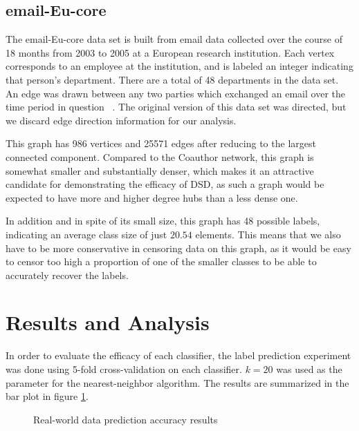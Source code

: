 \subsection{email-Eu-core}

The email-Eu-core data set is built from email data collected over the course of 18 months from 2003
to 2005 at a European research institution. Each vertex corresponds to an employee at the
institution, and is labeled an integer indicating that person's department. There are a total of 48
departments in the data set. An edge was drawn between any two parties which exchanged an email over
the time period in question ~\cite{snapnets}. The original version of this data set was directed,
but we discard edge direction information for our analysis.

This graph has 986 vertices and 25571 edges after reducing to the largest connected component.
Compared to the Coauthor network, this graph is somewhat smaller and substantially denser, which
makes it an attractive candidate for demonstrating the efficacy of DSD, as such a graph would be
expected to have more and higher degree hubs than a less dense one.

In addition and in spite of its small size, this graph has 48 possible labels, indicating an average
class size of just $20.54$ elements. This means that we also have to be more conservative in
censoring data on this graph, as it would be easy to censor too high a proportion of one of the
smaller classes to be able to accurately recover the labels.


\section{Results and Analysis}

In order to evaluate the efficacy of each classifier, the label prediction experiment was done using
5-fold cross-validation on each classifier. $k=20$ was used as the parameter for the
nearest-neighbor algorithm. The results are summarized in the bar plot in figure
\ref{fig:real_world_results}.

\begin{figure}[H]
  \centering
  \caption{Real-world data prediction accuracy results}
  \label{fig:real_world_results}
\end{figure}

